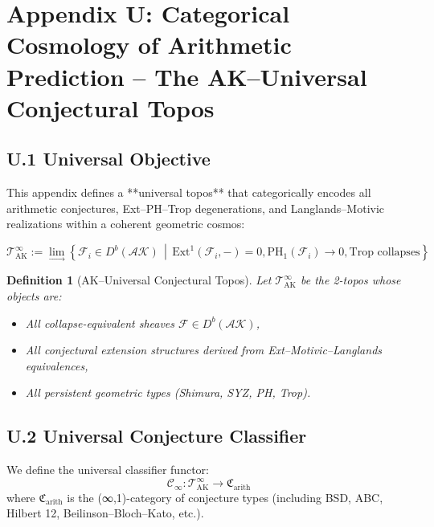 \documentclass[11pt]{article}
\newtheorem{definition}[theorem]{Definition}
\begin{document}

\section*{Appendix U: Categorical Cosmology of Arithmetic Prediction – The AK–Universal Conjectural Topos}

\subsection*{U.1 Universal Objective}

This appendix defines a **universal topos** that categorically encodes all arithmetic conjectures, Ext–PH–Trop degenerations, and Langlands–Motivic realizations within a coherent geometric cosmos:

\[
\boxed{
\mathscr{T}_{\mathrm{AK}}^{\infty} := \lim_{\longrightarrow}
  \left\{
    \mathcal{F}_i \in D^b(\mathcal{AK}) \,\middle|\,
    \mathrm{Ext}^1(\mathcal{F}_i, -) = 0,
    \mathrm{PH}_1(\mathcal{F}_i) \to 0,
    \text{Trop collapses}
  \right\}
}
\]

\begin{definition}[AK–Universal Conjectural Topos]
Let \( \mathscr{T}_{\mathrm{AK}}^{\infty} \) be the 2-topos whose objects are:
\begin{itemize}
  \item All collapse-equivalent sheaves \( \mathcal{F} \in D^b(\mathcal{AK}) \),
  \item All conjectural extension structures derived from Ext–Motivic–Langlands equivalences,
  \item All persistent geometric types (Shimura, SYZ, PH, Trop).
\end{itemize}
\end{definition}

\subsection*{U.2 Universal Conjecture Classifier}

We define the universal classifier functor:
\[
\mathscr{C}_\infty : \mathscr{T}_{\mathrm{AK}}^{\infty} \to \mathfrak{C}_{\mathrm{arith}}
\]
where \( \mathfrak{C}_{\mathrm{arith}} \) is the (∞,1)-category of conjecture types  
(including BSD, ABC, Hilbert 12, Beilinson–Bloch–Kato, etc.).
\end{document}
